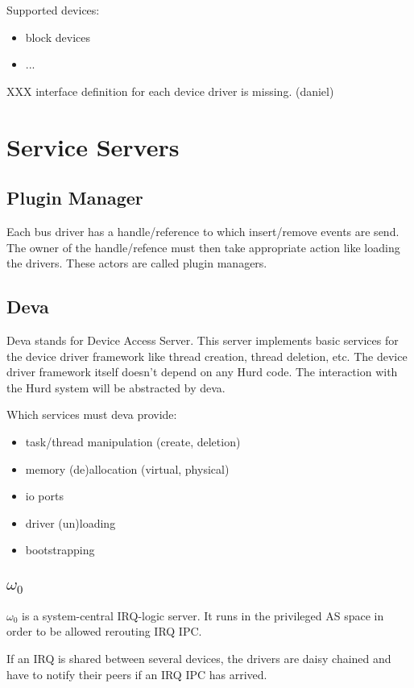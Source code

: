 Supported devices:
\begin{itemize}
\item block devices
\item ...
\end{itemize}

XXX interface definition for each device driver is missing. (daniel)


\section{Service Servers}

\subsection{Plugin Manager}

Each bus driver has a handle/reference to which insert/remove events
are send.  The owner of the handle/refence must then take
appropriate action like loading the drivers.  These actors are
called plugin managers.

\subsection{Deva}

Deva stands for Device Access Server.  This server implements basic
services for the device driver framework like thread creation, thread
deletion, etc.  The device driver framework itself doesn't depend on
any Hurd code.  The interaction with the Hurd system will be
abstracted by deva. 

Which services must deva provide:
\begin{itemize}
\item task/thread manipulation (create, deletion)
\item memory (de)allocation (virtual, physical)
\item io ports 
\item driver (un)loading
\item bootstrapping
\end{itemize}

\subsection{$\omega_0$}

$\omega_0$ is a system-central IRQ-logic server. It runs in the
privileged AS space in order to be allowed rerouting IRQ IPC.

If an IRQ is shared between several devices, the drivers are daisy
chained and have to notify their peers if an IRQ IPC has arrived.

